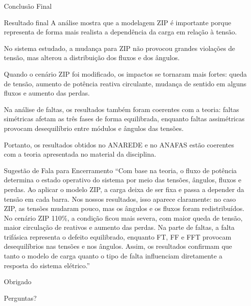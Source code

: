 \documentclass[aspectratio=169,11pt]{beamer}
\begin{document}
\begin{frame}{Conclusão Final}
  \begin{block}{Resultado final}
    A análise mostra que a modelagem ZIP é importante porque representa de forma mais realista a dependência da carga em relação à tensão.
  \end{block}

  \vspace{0.25cm}
  No sistema estudado, a mudança para ZIP não provocou grandes violações de tensão, mas alterou a distribuição dos fluxos e dos ângulos.

  \vspace{0.25cm}
  Quando o cenário ZIP foi modificado, os impactos se tornaram mais fortes: queda de tensão, aumento de potência reativa circulante, mudança de sentido em alguns fluxos e aumento das perdas.

  \vspace{0.25cm}
  Na análise de faltas, os resultados também foram coerentes com a teoria: faltas simétricas afetam as três fases de forma equilibrada, enquanto faltas assimétricas provocam desequilíbrio entre módulos e ângulos das tensões.

  \vspace{0.25cm}
  Portanto, os resultados obtidos no ANAREDE e no ANAFAS estão coerentes com a teoria apresentada no material da disciplina.
\end{frame}

\begin{frame}{Sugestão de Fala para Encerramento}
  \small
  ``Com base na teoria, o fluxo de potência determina o estado operativo do sistema por meio das tensões, ângulos, fluxos e perdas. Ao aplicar o modelo ZIP, a carga deixa de ser fixa e passa a depender da tensão em cada barra. Nos nossos resultados, isso aparece claramente: no caso ZIP, as tensões mudaram pouco, mas os ângulos e os fluxos foram redistribuídos. No cenário ZIP 110\%, a condição ficou mais severa, com maior queda de tensão, maior circulação de reativos e aumento das perdas. Na parte de faltas, a falta trifásica representa o defeito equilibrado, enquanto FT, FF e FFT provocam desequilíbrios nas tensões e nos ângulos. Assim, os resultados confirmam que tanto o modelo de carga quanto o tipo de falta influenciam diretamente a resposta do sistema elétrico.''
\end{frame}

\begin{frame}
  \centering
  \Huge Obrigado

  \vspace{0.7cm}
  \Large Perguntas?
\end{frame}
\end{document}
